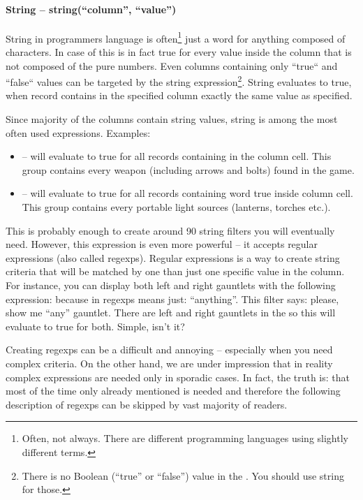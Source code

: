 \paragraph{String -- string(``column'', ``value'')}
String in programmers language is often\footnote{Often, not always. There are different programming languages using slightly different terms.}
just a word for anything composed of characters. In case of \OCS{} this is in fact true for every value inside the column that is not composed
of the pure numbers. Even columns containing only ``true`` and ``false`` values can be targeted by the string expression\footnote{There is no
Boolean (``true'' or ``false'') value in the \OCS. You should use string for those.}. String evaluates to true,
when record contains in the specified column exactly the same value as specified.

Since majority of the columns contain string values, string is among the most often used expressions. Examples:
\begin{itemize}
 \item {} -- will evaluate to true for all records containing  in the  column cell.
 This group contains every weapon (including arrows and bolts) found in the game.
 \item {} -- will evaluate to true for all records containing word true inside  column cell.
 This group contains every portable light sources (lanterns, torches etc.).
\end{itemize}
This is probably enough to create around 90 string filters you will eventually need. However, this expression is even more powerful
-- it accepts regular expressions (also called regexps). Regular expressions is a way to create string criteria that will be matched
by one than just one specific value in the column. For instance, you can display both left and right gauntlets with the following expression:
 because  in regexps means just: ``anything''. This filter says: please, show me ``any'' gauntlet.
There are left and right gauntlets in the \MW{} so this will evaluate to true for both. Simple, isn't it?

Creating regexps can be a difficult and annoying -- especially when you need complex criteria. On the other hand, we are under impression that in reality complex expressions are needed only in sporadic cases. In fact, the truth is: that most of the time only already mentioned
 is needed and therefore the following description of regexps can be skipped by vast majority of readers.

